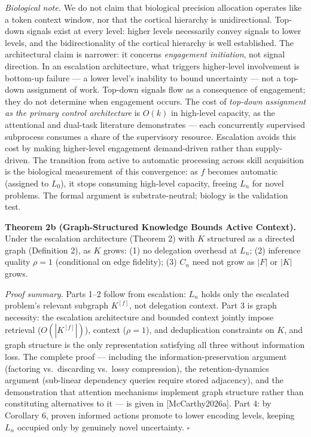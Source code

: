 \documentclass[
]{article}
\begin{document}
\emph{Biological note.} We do not claim that biological precision
allocation operates like a token context window, nor that the cortical
hierarchy is unidirectional. Top-down signals exist at every level:
higher levels necessarily convey signals to lower levels, and the
bidirectionality of the cortical hierarchy is well established. The
architectural claim is narrower: it concerns \emph{engagement
initiation}, not signal direction. In an escalation architecture, what
triggers higher-level involvement is bottom-up failure --- a lower
level's inability to bound uncertainty --- not a top-down assignment of
work. Top-down signals flow as a consequence of engagement; they do not
determine when engagement occurs. The cost of \emph{top-down assignment
as the primary control architecture} is \(O(k)\) in high-level capacity,
as the attentional and dual-task literature demonstrates --- each
concurrently supervised subprocess consumes a share of the supervisory
resource. Escalation avoids this cost by making higher-level engagement
demand-driven rather than supply-driven. The transition from active to
automatic processing across skill acquisition is the biological
measurement of this convergence: as \(f\) becomes automatic (assigned to
\(L_0\)), it stops consuming high-level capacity, freeing \(L_n\) for
novel problems. The formal argument is substrate-neutral; biology is the
validation test.

\textbf{Theorem 2b (Graph-Structured Knowledge Bounds Active Context).}
Under the escalation architecture (Theorem 2) with \(K\) structured as a
directed graph (Definition 2), as \(K\) grows: (1) no delegation
overhead at \(L_n\); (2) inference quality \(\rho = 1\) (conditional on
edge fidelity); (3) \(C_n\) need not grow as \(|F|\) or \(|K|\) grows.

\emph{Proof summary.} Parts 1--2 follow from escalation: \(L_n\) holds
only the escalated problem's relevant subgraph \(K^{[f]}\), not
delegation context. Part 3 is graph necessity: the escalation
architecture and bounded context jointly impose retrieval
(\(O(|K^{[f]}|)\)), context (\(\rho = 1\)), and deduplication
constraints on \(K\), and graph structure is the only representation
satisfying all three without information loss. The complete proof ---
including the information-preservation argument (factoring vs.\
discarding vs.\ lossy compression), the retention-dynamics argument
(sub-linear dependency queries require stored adjacency), and the
demonstration that attention mechanisms implement graph structure rather
than constituting alternatives to it --- is given in
{[}McCarthy2026a{]}. Part 4: by Corollary 6, proven informed actions
promote to lower encoding levels, keeping \(L_n\) occupied only by
genuinely novel uncertainty. \(\square\)
\end{document}
